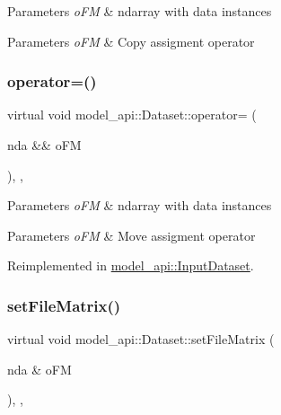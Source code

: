 \begin{DoxyParams}{Parameters}
{\em o\+FM} & ndarray with data instances \\
\hline
\end{DoxyParams}

\begin{DoxyParams}{Parameters}
{\em o\+FM} & Copy assigment operator \\
\hline
\end{DoxyParams}
\mbox{\label{classmodel__api_1_1Dataset_a48ed0afad3bae183a4615a4de9dba854}} 
\subsubsection{\texorpdfstring{operator=()}{operator=()}\hspace{0.1cm}{\footnotesize\ttfamily [2/2]}}
{\footnotesize\ttfamily virtual void model\+\_\+api\+::\+Dataset\+::operator= (\begin{DoxyParamCaption}\item[{nda \&\&}]{o\+FM }\end{DoxyParamCaption})\hspace{0.3cm}{\ttfamily [inline]}, {\ttfamily [protected]}, {\ttfamily [virtual]}}


\begin{DoxyParams}{Parameters}
{\em o\+FM} & ndarray with data instances \\
\hline
\end{DoxyParams}

\begin{DoxyParams}{Parameters}
{\em o\+FM} & Move assigment operator \\
\hline
\end{DoxyParams}


Reimplemented in \hyperlink{classmodel__api_1_1InputDataset_a192c20a95f93e03b4c4adb07e8e5e077}{model\+\_\+api\+::\+Input\+Dataset}.

\mbox{\label{classmodel__api_1_1Dataset_a50e8c50a3b45cb39cf4403ebfdc1c2dc}} 
\subsubsection{\texorpdfstring{set\+File\+Matrix()}{setFileMatrix()}}
{\footnotesize\ttfamily virtual void model\+\_\+api\+::\+Dataset\+::set\+File\+Matrix (\begin{DoxyParamCaption}\item[{nda \&}]{o\+FM }\end{DoxyParamCaption})\hspace{0.3cm}{\ttfamily [inline]}, {\ttfamily [protected]}, {\ttfamily [virtual]}}


